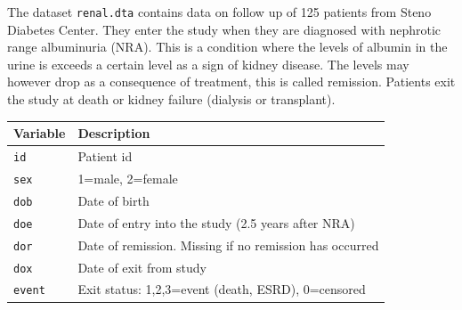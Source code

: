 \documentclass[
]{book}
\newcounter{none} %
\theoremstyle{definition}
\theoremstyle{definition}
\theoremstyle{definition}
\theoremstyle{definition}
\theoremstyle{remark}
\begin{document}
The dataset \texttt{renal.dta} contains data on follow up of 125
patients from Steno Diabetes Center. They enter the study when they
are diagnosed with nephrotic range albuminuria (NRA). This is a
condition where the levels of albumin in the urine is exceeds a
certain level as a sign of kidney disease. The levels may however drop
as a consequence of treatment, this is called remission. Patients exit
the study at death or kidney failure (dialysis or transplant).

{\def\LTcaptype{none} %
\begin{longtable}[]{@{}ll@{}}
\toprule\noalign{}
Variable & Description \\
\midrule\noalign{}
\endhead
\bottomrule\noalign{}
\endlastfoot
\texttt{id} & Patient id \\
\texttt{sex} & 1=male, 2=female \\
\texttt{dob} & Date of birth \\
\texttt{doe} & Date of entry into the study (2.5 years after NRA) \\
\texttt{dor} & Date of remission. Missing if no remission has occurred \\
\texttt{dox} & Date of exit from study \\
\texttt{event} & Exit status: 1,2,3=event (death, ESRD), 0=censored \\
\end{longtable}
}
\end{document}
